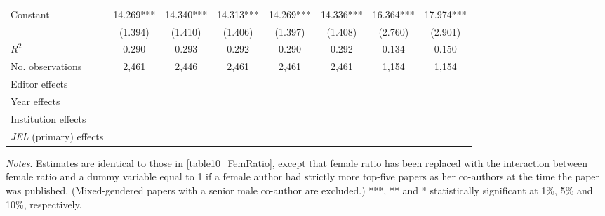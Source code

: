 \begin{table}
\begin{adjustwidth}{-0.085cm}{}
\begin{threeparttable}
\begin{tabular}{p{2.64cm}SSSSSSS}
            Constant                      &      14.269***&      14.340***&      14.313***&      14.269***&      14.336***&      16.364***&      17.974***\\
                                          &     (1.394)   &     (1.410)   &     (1.406)   &     (1.397)   &     (1.408)   &     (2.760)   &     (2.901)   \\
            \midrule
            \(R^2\)                       &       0.290   &       0.293   &       0.292   &       0.290   &       0.292   &       0.134   &       0.150   \\
            No. observations              &       2,461   &       2,446   &       2,461   &       2,461   &       2,461   &       1,154   &       1,154   \\
            \midrule
            Editor effects        &           {}   &           {}   &           {}   &           {}   &           {}   &           {}   &           {}   \\
            Year effects                  &           {}   &           {}   &           {}   &           {}   &           {}   &           {}   &           {}   \\
            Institution effects           &           {}   &           {}   &           {}   &           {}   &           {}   &           {}   &           {}   \\
            \textit{JEL} (primary) effects&               &               &               &               &               &               &           {}   \\
            \bottomrule
        \end{tabular}
        \begin{tablenotes}
            \tiny
            \item \textit{Notes}. Estimates are identical to those in \autoref{table10_FemRatio}, except that female ratio has been replaced with the interaction between female ratio and a dummy variable equal to 1 if a female author had strictly more top-five papers as her co-authors at the time the paper was published. (Mixed-gendered papers with a senior male co-author are excluded.) ***, ** and * statistically significant at 1\%, 5\% and 10\%, respectively.
        \end{tablenotes}
    \end{threeparttable}
    \end{adjustwidth}
\end{table}